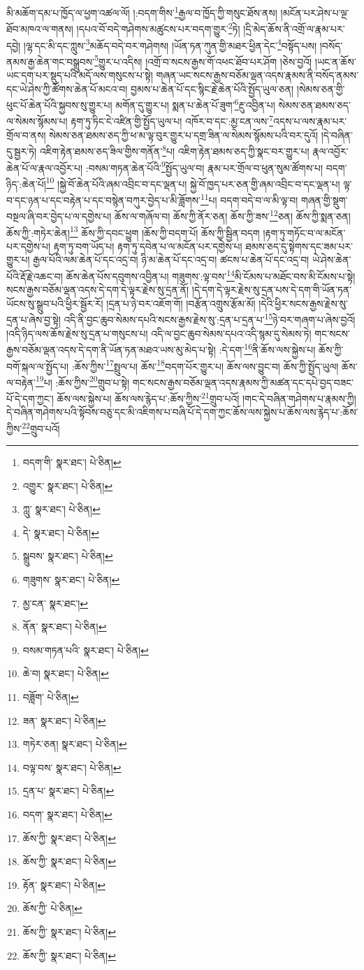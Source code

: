 མི་མཆོག་དམ་པ་ཁྱོད་ལ་ཕྱག་འཚལ་ལོ། །:བདག་གིས་\footnote{བདག་གི་  སྣར་ཐང་།  པེ་ཅིན། }རྒྱལ་བ་ཁྱོད་ཀྱི་གསུང་ཐོས་ནས། །མངོན་པར་ཤེས་པ་ལྔ་ཐོབ་མཁའ་ལ་གནས། །དཔའ་བོ་བདེ་གཤེགས་མཚུངས་པར་བདག་གྱུར་\footnote{འགྱུར་  སྣར་ཐང་།  པེ་ཅིན། }ཏེ། །དྲི་མེད་ཆོས་ནི་འགྲོ་ལ་རྣམ་པར་དབྱེ། །ལྷ་དང་མི་དང་ཀླུས་\footnote{ཀླུ་  སྣར་ཐང་།  པེ་ཅིན། }མཆོད་བདེ་བར་གཤེགས། །ཡོན་ཏན་ཀུན་གྱི་མཐར་ཕྱིན་དེང་\footnote{དེ་  སྣར་ཐང་།  པེ་ཅིན། }བསྟོད་པས། །བསོད་ནམས་རྒྱ་ཆེན་གང་བསྒྲུབས་\footnote{སྒྲུབས་  སྣར་ཐང་།  པེ་ཅིན། }གྱུར་པ་འདིས། །འགྲོ་བ་སངས་རྒྱས་གོ་འཕང་ཐོབ་པར་ཤོག །ཅེས་བྱའོ། །ཡང་ན་ཆོས་ཡང་དག་པར་སྡུད་པའི་མདོ་ལས་གསུངས་པ་སྟེ། གཞན་ཡང་སངས་རྒྱས་བཅོམ་ལྡན་འདས་རྣམས་ནི་བསོད་ནམས་དང་ཡེ་ཤེས་ཀྱི་ཚོགས་ཆེན་པོ་མངའ་བ། བྱམས་པ་ཆེན་པོ་དང་སྙིང་རྗེ་ཆེན་པོའི་སྤྱོད་ཡུལ་ཅན། །སེམས་ཅན་གྱི་ཕུང་པོ་ཆེན་པོའི་སྐྱབས་སུ་གྱུར་པ། མགོན་དུ་གྱུར་པ། སྨན་པ་ཆེན་པོ་ཟུག་\footnote{གཟུགས་  སྣར་ཐང་།  པེ་ཅིན། }རྔུ་འབྱིན་པ། སེམས་ཅན་ཐམས་ཅད་ལ་སེམས་སྙོམས་པ། རྟག་ཏུ་ཏིང་ངེ་འཛིན་གྱི་སྤྱོད་ཡུལ་པ། འཁོར་བ་དང་:མྱ་ངན་ལས་\footnote{མྱ་ངན་  སྣར་ཐང་། }འདས་པ་ལས་རྣམ་པར་གྲོལ་བ་ནས། སེམས་ཅན་ཐམས་ཅད་ཀྱི་ཕ་མ་ལྟ་བུར་གྱུར་པ་དགྲ་ཟིན་ལ་སེམས་སྙོམས་པའི་བར་དུའོ། །དེ་བཞིན་དུ་སྦྱར་ཏེ། འཇིག་རྟེན་ཐམས་ཅད་ཟིལ་གྱིས་གནོན་\footnote{ནོན་  སྣར་ཐང་།  པེ་ཅིན། }པ། འཇིག་རྟེན་ཐམས་ཅད་ཀྱི་སྣང་བར་གྱུར་པ། རྣལ་འབྱོར་ཆེན་པོ་ལ་རྣལ་འབྱོར་པ། :བསམ་གཏན་ཆེན་པོའི་\footnote{བསམ་གཏན་པའི་  སྣར་ཐང་།  པེ་ཅིན། }སྤྱོད་ཡུལ་བ། རྣམ་པར་གྲོལ་བ་ཕུན་སུམ་ཚོགས་པ། བདག་ཉིད་:ཆེན་པོ།\footnote{ཆེ་བ།  སྣར་ཐང་།  པེ་ཅིན། } །སྐྱེ་བོ་ཆེན་པོའི་ཞམ་འབྲིང་བ་དང་ལྡན་པ། སྐྱེ་བོ་ཁྱད་པར་ཅན་གྱི་ཞམ་འབྲིང་བ་དང་ལྡན་པ། ལྟ་བ་དང་ཉན་པ་དང་བརྟེན་པ་དང་བསྙེན་བཀུར་བྱེད་པ་མི་ཟློགས་\footnote{བཟློག་  པེ་ཅིན། }པ། བདག་བདེ་བ་ལ་མི་ལྟ་བ། གཞན་གྱི་སྡུག་བསྔལ་ཞི་བར་བྱེད་པ་ལ་དགྱེས་པ། ཆོས་ལ་གཞོལ་བ། ཆོས་ཀྱི་ནོར་ཅན། ཆོས་ཀྱི་ཟས་\footnote{ཟན་  སྣར་ཐང་།  པེ་ཅིན། }ཅན། ཆོས་ཀྱི་སྨན་ཅན། ཆོས་ཀྱི་:གཏེར་ཆེན།\footnote{གཏེར་ཅན།  སྣར་ཐང་།  པེ་ཅིན། } ཆོས་ཀྱི་དབང་ཕྱུག །ཆོས་ཀྱི་བདག་པོ། ཆོས་ཀྱི་སྦྱིན་བདག །རྟག་ཏུ་གཏོང་བ་ལ་མངོན་པར་དགྱེས་པ། རྟག་ཏུ་བག་ཡོད་པ། རྟག་ཏུ་དབེན་པ་ལ་མངོན་པར་དགྱེས་པ། ཐམས་ཅད་དུ་སྟེགས་དང་ཟམ་པར་གྱུར་པ། རྒྱལ་པོའི་ལམ་ཆེན་པོ་དང་འདྲ་བ། ཉི་མ་ཆེན་པོ་དང་འདྲ་བ། ཚངས་པ་ཆེན་པོ་དང་འདྲ་བ། ཡེ་ཤེས་ཆེན་པོའི་རྡོ་རྗེ་འཆང་བ། ཆོས་ཆེན་པོས་དབུགས་འབྱིན་པ། གཟུགས་:ལྟ་བས་\footnote{བལྟ་བས་  སྣར་ཐང་།  པེ་ཅིན། }མི་ངོམས་པ་མཐོང་བས་མི་ངོམས་པ་སྟེ། སངས་རྒྱས་བཅོམ་ལྡན་འདས་དེ་དག་དེ་ལྟར་རྗེས་སུ་དྲན་ནོ། །དེ་དག་དེ་ལྟར་རྗེས་སུ་དྲན་པས་དེ་དག་གི་ཡོན་ཏན་ཡོངས་སུ་སྒྲུབ་པའི་ཕྱིར་སྦྱོར་རོ། །དྲན་པ་ཉེ་བར་འཇོག་གོ། །བརྩོན་འགྲུས་རྩོམ་མོ། །དེའི་ཕྱིར་སངས་རྒྱས་རྗེས་སུ་དྲན་པ་ཞེས་བྱ་སྟེ། འདི་ནི་བྱང་ཆུབ་སེམས་དཔའི་སངས་རྒྱས་རྗེས་སུ་:དྲན་པ་དྲན་པ་\footnote{དྲན་པ་  སྣར་ཐང་།  པེ་ཅིན། }ཉེ་བར་གཞག་པ་ཞེས་བྱའོ། །འདི་ཉིད་ལས་ཆོས་རྗེས་སུ་དྲན་པ་གསུངས་པ། འདི་ལ་བྱང་ཆུབ་སེམས་དཔའ་འདི་སྙམ་དུ་སེམས་ཏེ། གང་སངས་རྒྱས་བཅོམ་ལྡན་འདས་དེ་དག་ནི་ཡོན་ཏན་མཐའ་ཡས་མུ་མེད་པ་སྟེ། :དེ་དག་\footnote{བདག་  སྣར་ཐང་།  པེ་ཅིན། }ནི་ཆོས་ལས་སྐྱེས་པ། ཆོས་ཀྱི་བགོ་སྐལ་ལ་སྤྱོད་པ། :ཆོས་ཀྱིས་\footnote{ཆོས་ཀྱི་  སྣར་ཐང་།  པེ་ཅིན། }སྤྲུལ་པ། ཆོས་\footnote{ཆོས་ཀྱི་  སྣར་ཐང་།  པེ་ཅིན། }བདག་པོར་གྱུར་པ། ཆོས་ལས་བྱུང་བ། ཆོས་ཀྱི་སྤྱོད་ཡུལ། ཆོས་ལ་བརྟེན་\footnote{རྟོན་  སྣར་ཐང་།  པེ་ཅིན། }པ། :ཆོས་ཀྱིས་\footnote{ཆོས་ཀྱི་  པེ་ཅིན། }གྲུབ་པ་སྟེ། གང་སངས་རྒྱས་བཅོམ་ལྡན་འདས་རྣམས་ཀྱི་མཚན་དང་དཔེ་བྱད་བཟང་པོ་དེ་དག་ཀྱང་། ཆོས་ལས་སྐྱེས་པ། ཆོས་ལས་རྙེད་པ་:ཆོས་ཀྱིས་\footnote{ཆོས་ཀྱི་  སྣར་ཐང་།  པེ་ཅིན། }གྲུབ་པའོ། །གང་དེ་བཞིན་གཤེགས་པ་རྣམས་ཀྱི། དེ་བཞིན་གཤེགས་པའི་སྟོབས་བཅུ་དང་མི་འཇིགས་པ་བཞི་པོ་དེ་དག་ཀྱང་ཆོས་ལས་སྐྱེས་པ་ཆོས་ལས་རྙེད་པ་:ཆོས་ཀྱིས་\footnote{ཆོས་ཀྱི་  སྣར་ཐང་།  པེ་ཅིན། }གྲུབ་པའོ། 